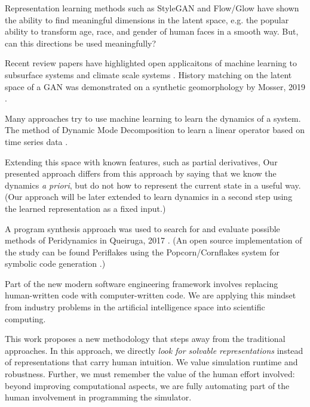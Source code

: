 \documentclass[AMA,STIX1COL]{WileyNJD-v2}
\begin{document}
Representation learning methods such as StyleGAN
\cite{karras_style-based_2018} and Flow/Glow \cite{kingma_glow:_2018} have shown
the ability to find meaningful dimensions in the latent space,
e.g. the popular ability to transform age, race, and gender of human
faces in a smooth way.
But, can this directions be used meaningfully?

Recent review papers have highlighted open applicaitons of machine
learning to subsurface systems \cite{bergen_machine_2019} and
climate scale systems  \cite{reichstein_deep_2019}.
History matching on the latent space of a GAN was demonstrated on a
synthetic geomorphology by Mosser, 2019 \cite{mosser_deepflow:_2019}.

Many approaches try to use machine learning to learn the dynamics of a
system.
The method of Dynamic Mode Decomposition
to learn a linear operator based on time series data \cite{tu_dynamic_2014,kutz_dynamic_2016}. 

Extending this space with known features, such as partial derivatives,
\cite{ one of kutz's students}
Our presented approach differs from this approach by saying that we
know the dynamics {\em a priori}, but do not how to represent the
current state in a useful way. (Our approach will be later extended to
learn dynamics in a second step using the learned representation as a
fixed input.)

\cite{wu_physics-informed_2018}
\cite{xie_tempogan:_2018}

 A program synthesis approach was used to search for and evaluate
 possible methods of Peridynamics in Queiruga, 2017
 \cite{queiruga_numerical_2017}. (An open source implementation of the
 study can be found Periflakes\cite{queiruga_periflakes_2019} using the
 Popcorn/Cornflakes system for symbolic code generation
 \cite{queiruga_cornflakes:_2018,queiruga_popcorn:_2018}.)

Part of the new modern software engineering framework involves replacing
human-written code with computer-written code. We are applying this
mindset from industry problems in the artificial
intelligence space into scientific computing.


This work proposes a new methodology that steps away from the
traditional approaches. 
In this approach, we directly \emph{look for solvable representations}
instead of representations that carry human intuition. We value
simulation runtime and robustness. Further, we must remember the value
of the human effort involved: beyond improving computational aspects,
we are fully automating part of the human involvement in programming
the simulator.
\end{document}
